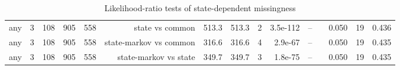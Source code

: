\begin{table}[ht]
\begin{tabular}{llrrrrrrrrrrrrr}
any & 3 & 108 & 905 & 558 & state vs common & 513.3 & 513.3 & 2 & 3.5e-112 & -- &  & 0.050 & 19 & 0.436 \\
any & 3 & 108 & 905 & 558 & state-markov vs common & 316.6 & 316.6 & 4 & 2.9e-67 & -- &  & 0.050 & 19 & 0.435 \\
any & 3 & 108 & 905 & 558 & state-markov vs state & 349.7 & 349.7 & 3 & 1.8e-75 & -- &  & 0.050 & 19 & 0.435 \\
\bottomrule
\end{tabular}
\caption{Likelihood-ratio tests of state-dependent missingness}
\end{table}
